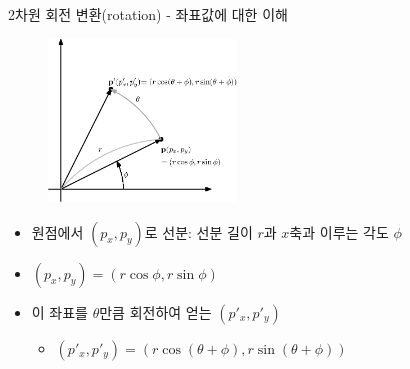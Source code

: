 \begin{frame}{2차원 회전 변환(rotation) - 좌표값에 대한 이해}

\begin{figure}
    \includegraphics[width=5cm]{Math_transform/rotation.eps}
\end{figure}

\begin{itemize}
\item 원점에서 $(p_x,p_y)$로 선분: 선분 길이 $r$과 $x$축과 이루는 각도 $\phi$
\item $(p_x, p_y) = (r \cos \phi,  r \sin \phi)$
\item 이 좌표를 $\theta$만큼 회전하여 얻는 $(p'_x , p'_y)$
	\begin{itemize}
	\item $(p'_x, p'_y) =  ( r \cos (\theta+ \phi) , r \sin (\theta + \phi) )$
	\end{itemize}
\end{itemize}

\end{frame}


